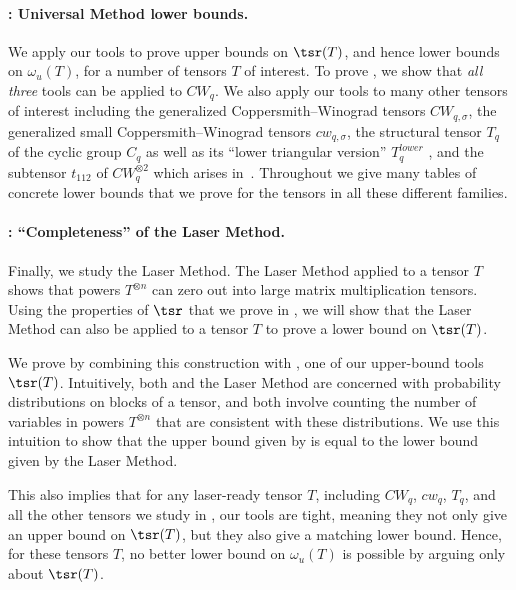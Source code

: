 \documentclass{toc}
\begin{document}
%
\paragraph{: Universal Method lower bounds.} We apply our tools to prove upper bounds on $\tsr(T)$, and hence lower bounds on $\omega_u(T)$, for a number of tensors $T$ of interest. To prove , we show that \emph{all three} tools can be applied to $CW_q$. We also apply our tools to many other tensors of interest including the generalized Coppersmith--Winograd tensors $CW_{q,\sigma}$, the generalized small Coppersmith--Winograd tensors $cw_{q,\sigma}$, the structural tensor $T_q$ of the cyclic group $C_q$ as well as its ``lower triangular version'' $T_q^{lower}$ , and the subtensor $t_{112}$ of $CW_q^{\otimes 2}$ which arises
%
in~\cite{coppersmith,stothers,v12,legall,awrefined,legallrect,legallrect2}. 
Throughout  we give many tables of concrete lower bounds that we prove for the tensors in all these different families.

\paragraph{: ``Completeness'' of the Laser Method.} Finally, we study the Laser Method. The Laser Method applied to a tensor $T$ shows that powers $T^{\otimes n}$ can zero out into large matrix multiplication tensors. Using the properties of $\tsr$ that we prove in , we will show that the Laser Method can also be applied to a tensor $T$ to prove a lower bound on $\tsr(T)$. %

We prove  by combining this construction with , one of our 
%
upper-bound tools  %
$\tsr(T)$. Intuitively, both  and the Laser Method are concerned with probability distributions on blocks of a tensor, and both involve counting the number of variables in powers $T^{\otimes n}$ that are consistent with these distributions. We use this intuition to show that the upper bound given by  is equal to the lower bound given by the Laser Method.

This also implies that for any laser-ready tensor $T$, including $CW_q$, $cw_q$, $T_q$, and all the other tensors we study in , our tools are tight, meaning they not only give an upper bound on $\tsr(T)$, but they also give a matching lower bound. Hence, for these tensors $T$, no better lower bound on $\omega_u(T)$ is possible by arguing only about $\tsr(T)$. 
\end{document}
